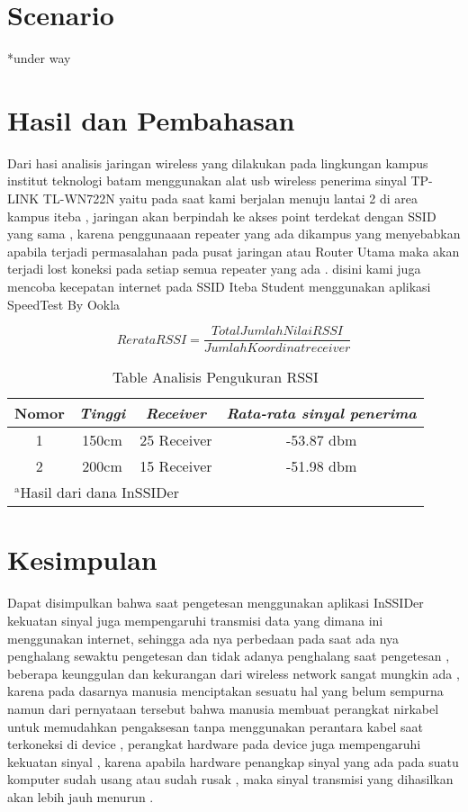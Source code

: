 \documentclass[conference]{IEEEtran}
\begin{document}
\section{Scenario}
*under way
\section{Hasil dan Pembahasan}

Dari hasi analisis jaringan wireless yang dilakukan pada lingkungan kampus
institut teknologi batam menggunakan alat usb wireless penerima sinyal TP-LINK TL-WN722N yaitu pada saat kami berjalan menuju lantai 2 di area kampus iteba , jaringan akan berpindah
ke akses point terdekat dengan SSID yang sama , karena penggunaaan repeater yang ada dikampus yang menyebabkan apabila terjadi permasalahan
pada pusat jaringan atau Router Utama maka akan terjadi lost koneksi pada setiap semua repeater yang ada .
disini kami juga mencoba kecepatan internet pada SSID Iteba Student menggunakan aplikasi SpeedTest By Ookla

\begin{equation}
    Rerata RSSI = \frac{Total Jumlah Nilai RSSI}{Jumlah Koordinat receiver}
    \label{rerata_rssi}
\end{equation}

\begin{table}[htbp]
    \caption{Table Analisis Pengukuran RSSI}
    \begin{center}
    \begin{tabular}{|c|c|c|c|}
        \hline
    \textbf{Nomor} & \textbf{\textit{Tinggi}}& \textbf{\textit{Receiver}}& \textbf{\textit{Rata-rata sinyal penerima}} \\
    \hline
    1 & 150cm& 25 Receiver & -53.87 dbm  \\
    \hline
    2 & 200cm& 15 Receiver & -51.98 dbm  \\
    \hline
    \multicolumn{4}{l}{$^{\mathrm{a}}$Hasil dari dana InSSIDer}
    \end{tabular}
    \label{tab1}
    \end{center}
    \end{table}

\section{Kesimpulan}
Dapat disimpulkan bahwa saat pengetesan menggunakan aplikasi InSSIDer kekuatan sinyal juga mempengaruhi transmisi data yang dimana ini menggunakan internet,
sehingga ada nya perbedaan pada saat ada nya penghalang sewaktu pengetesan dan tidak adanya penghalang saat pengetesan , beberapa keunggulan dan kekurangan dari wireless network 
sangat mungkin ada , karena pada dasarnya manusia menciptakan sesuatu hal yang belum sempurna namun dari pernyataan tersebut bahwa manusia membuat perangkat nirkabel untuk memudahkan pengaksesan 
tanpa menggunakan perantara kabel saat terkoneksi di device , perangkat hardware pada device juga mempengaruhi kekuatan sinyal , karena apabila hardware penangkap sinyal yang ada pada suatu 
komputer sudah usang atau sudah rusak , maka sinyal transmisi yang dihasilkan akan lebih jauh menurun .


\end{document}

